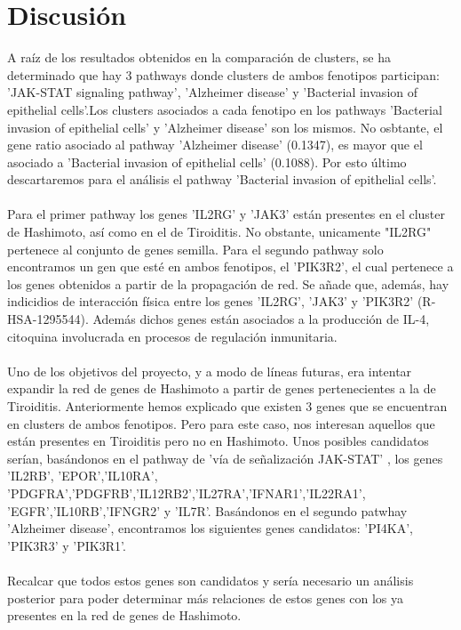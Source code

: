 \section{Discusión}
A raíz de los resultados obtenidos en la comparación de clusters, se ha determinado que hay 3 pathways donde clusters de ambos fenotipos participan: 'JAK-STAT signaling pathway', 'Alzheimer disease' y 'Bacterial invasion of epithelial cells'.Los clusters asociados a cada fenotipo en los pathways 'Bacterial invasion of epithelial cells' y 'Alzheimer disease' son los mismos. No osbtante, el gene ratio asociado al pathway 'Alzheimer disease' (0.1347), es mayor que el asociado a 'Bacterial invasion of epithelial cells' (0.1088). Por esto último descartaremos para el análisis el pathway 'Bacterial invasion of epithelial cells'.
\\ \\
Para el primer pathway los genes 'IL2RG' y 'JAK3' están presentes en el cluster de Hashimoto, así como en el de Tiroiditis. No obstante, unicamente "IL2RG" pertenece al conjunto de genes semilla. Para el segundo pathway solo encontramos un gen que esté en ambos fenotipos, el 'PIK3R2', el cual pertenece a los genes obtenidos a partir de la propagación de red. Se añade que, además, hay indicidios de  interacción física entre los genes 'IL2RG', 'JAK3' y 'PIK3R2' (R-HSA-1295544). Además dichos genes están asociados a la producción de IL-4, citoquina involucrada en procesos de regulación inmunitaria\cite{Gadani2012}. 
\\ \\
Uno de los objetivos del proyecto, y a modo de líneas futuras, era intentar expandir la red de genes de Hashimoto a partir de genes pertenecientes a la de Tiroiditis. Anteriormente hemos explicado que existen 3 genes que se encuentran en clusters de ambos fenotipos. Pero para este caso, nos interesan aquellos que están presentes en Tiroiditis pero no en Hashimoto. Unos posibles candidatos serían, basándonos en el pathway de 'vía de señalización JAK-STAT' , los genes 'IL2RB', 'EPOR','IL10RA', 'PDGFRA','PDGFRB','IL12RB2','IL27RA','IFNAR1','IL22RA1',
'EGFR','IL10RB','IFNGR2' y 'IL7R'. Basándonos en el segundo patwhay 'Alzheimer disease', encontramos los siguientes genes candidatos: 'PI4KA', 'PIK3R3' y 'PIK3R1'.
\\ \\
Recalcar que todos estos genes son candidatos y sería necesario un análisis posterior para poder determinar más relaciones de estos genes con los ya presentes en la red de genes de Hashimoto.

